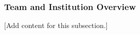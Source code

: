 
\subsubsection{Team and Institution Overview}
\label{subsubsec:design_1_2_team_institution_overview}

[Add content for this subsection.]
